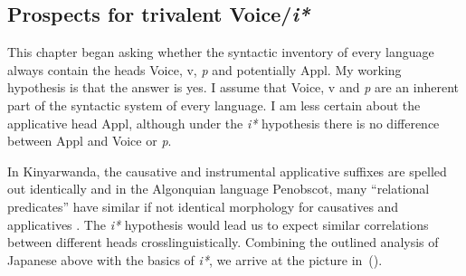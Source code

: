 	\subsection{Prospects for trivalent Voice/\textit{i*}} \label{i:i:ay}
This chapter began asking whether the syntactic inventory of every language always contain the heads Voice, v, \textit{p} and potentially Appl. My working hypothesis is that the answer is yes. I assume that Voice, v and \emph{p} are an inherent part of the syntactic system of every language. I am less certain about the applicative head Appl, although under the \textit{i*} hypothesis there is no difference between Appl and Voice or \textit{p}. 

In Kinyarwanda, the causative and instrumental applicative suffixes are spelled out identically \citep{jerro17} and in the Algonquian language Penobscot, many ``relational predicates'' have similar if not identical morphology for causatives and applicatives \citep[Ch.~2.3.7.1]{quinn06phd}. The \emph{i*} hypothesis would lead us to expect similar correlations between different heads crosslinguistically. Combining the outlined analysis of Japanese above with the basics of \emph{i*}, we arrive at the picture in~(\nextx).



